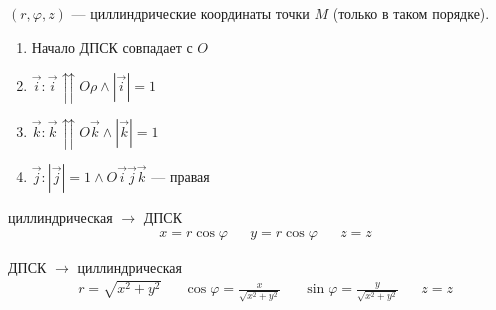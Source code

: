\documentclass{article}
\begin{document}
$(r,\varphi,z)$ --- циллиндрические координаты точки $M$ (только в таком порядке).


\begin{enumerate}
	\item{}Начало ДПСК совпадает с $O$
	\item{}$\vec{i}:\vec{i}\upuparrows O\rho\land|\vec{i}|=1$
	\item{}$\vec{k}:\vec{k}\upuparrows O\vec{k}\land|\vec{k}|=1$
	\item{}$\vec{j}:|\vec{j}|=1\land O\vec{i}\vec{j}\vec{k}\text{ --- правая}$
\end{enumerate}

циллиндрическая $\to$ ДПСК
\begin{align*}
	 & x=r\cos\varphi &  & y=r\cos\varphi &  & z=z
\end{align*}


ДПСК $\to$ циллиндрическая
\begin{align*}
	 & r=\sqrt{x^{2}+y^{2}} &  & \cos\varphi=\frac{x}{\sqrt{x^{2}+y^{2}}} &  & \sin\varphi=\frac{y}{\sqrt{x^{2}+y^{2}}} &  & z=z
\end{align*}
\end{document}

